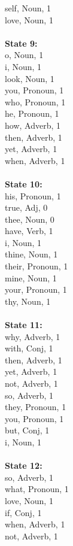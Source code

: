 \begin{multicols}{4}
self, Noun, 1\\
love, Noun, 1\\
\\
\noindent\textbf{State 9:} \\
o, Noun, 1\\
i, Noun, 1\\
look, Noun, 1\\
you, Pronoun, 1\\
who, Pronoun, 1\\
he, Pronoun, 1\\
how, Adverb, 1\\
then, Adverb, 1\\
yet, Adverb, 1\\
when, Adverb, 1\\
\\
\noindent\textbf{State 10:} \\
his, Pronoun, 1\\
true, Adj, 0\\
thee, Noun, 0\\
have, Verb, 1\\
i, Noun, 1\\
thine, Noun, 1\\
their, Pronoun, 1\\
mine, Noun, 1\\
your, Pronoun, 1\\
thy, Noun, 1\\
\\
\noindent\textbf{State 11:} \\
why, Adverb, 1\\
with, Conj, 1\\
then, Adverb, 1\\
yet, Adverb, 1\\
not, Adverb, 1\\
so, Adverb, 1\\
they, Pronoun, 1\\
you, Pronoun, 1\\
but, Conj, 1\\
i, Noun, 1\\
\\
\noindent\textbf{State 12:} \\
so, Adverb, 1\\
what, Pronoun, 1\\
love, Noun, 1\\
if, Conj, 1\\
when, Adverb, 1\\
not, Adverb, 1\\

\end{multicols}
